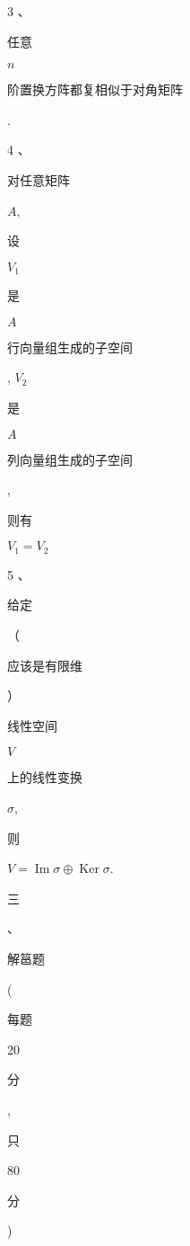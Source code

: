 \documentclass[10pt]{article}
\begin{document}
3 、\begin{CJK}{UTF8}{mj}任意\end{CJK} $n$ \begin{CJK}{UTF8}{mj}阶置换方阵都复相似于对角矩阵\end{CJK}.

4 、\begin{CJK}{UTF8}{mj}对任意矩阵\end{CJK} $A$, \begin{CJK}{UTF8}{mj}设\end{CJK} $V_{1}$ \begin{CJK}{UTF8}{mj}是\end{CJK} $A$ \begin{CJK}{UTF8}{mj}行向量组生成的子空间\end{CJK}, $V_{2}$ \begin{CJK}{UTF8}{mj}是\end{CJK} $A$ \begin{CJK}{UTF8}{mj}列向量组生成的子空间\end{CJK}, \begin{CJK}{UTF8}{mj}则有\end{CJK} $V_{1}=V_{2}$

5 、\begin{CJK}{UTF8}{mj}给定\end{CJK}（\begin{CJK}{UTF8}{mj}应该是有限维\end{CJK}）\begin{CJK}{UTF8}{mj}线性空间\end{CJK} $V$ \begin{CJK}{UTF8}{mj}上的线性变换\end{CJK} $\sigma$, \begin{CJK}{UTF8}{mj}则\end{CJK} $V=\operatorname{Im} \sigma \oplus \operatorname{Ker} \sigma$.

\begin{CJK}{UTF8}{mj}三\end{CJK}、\begin{CJK}{UTF8}{mj}解䇼题\end{CJK} (\begin{CJK}{UTF8}{mj}每题\end{CJK} 20 \begin{CJK}{UTF8}{mj}分\end{CJK}, \begin{CJK}{UTF8}{mj}只\end{CJK} 80 \begin{CJK}{UTF8}{mj}分\end{CJK})
\end{document}

